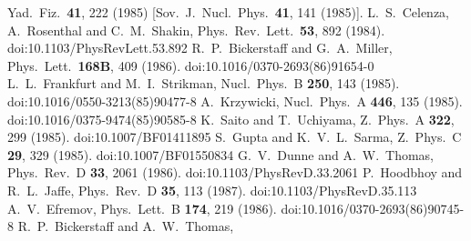 \documentclass{ws-ijmpe}
\begin{document}
\begin{thebibliography}{0}
  Yad.\ Fiz.\  {\bf 41}, 222 (1985)
  [Sov.\ J.\ Nucl.\ Phys.\  {\bf 41}, 141 (1985)].
%
  L.~S.~Celenza, A.~Rosenthal and C.~M.~Shakin,
  Phys.\ Rev.\ Lett.\  {\bf 53}, 892 (1984).
  doi:10.1103/PhysRevLett.53.892
%
  R.~P.~Bickerstaff and G.~A.~Miller,
  Phys.\ Lett.\  {\bf 168B}, 409 (1986).
  doi:10.1016/0370-2693(86)91654-0
%
  L.~L.~Frankfurt and M.~I.~Strikman,
  Nucl.\ Phys.\ B {\bf 250}, 143 (1985).
  doi:10.1016/0550-3213(85)90477-8
%
  A.~Krzywicki,
  Nucl.\ Phys.\ A {\bf 446}, 135 (1985).
  doi:10.1016/0375-9474(85)90585-8
%
  K.~Saito and T.~Uchiyama,
  Z.\ Phys.\ A {\bf 322}, 299 (1985).
  doi:10.1007/BF01411895
%
  S.~Gupta and K.~V.~L.~Sarma,
  Z.\ Phys.\ C {\bf 29}, 329 (1985).
  doi:10.1007/BF01550834
%
  G.~V.~Dunne and A.~W.~Thomas,
  Phys.\ Rev.\ D {\bf 33}, 2061 (1986).
  doi:10.1103/PhysRevD.33.2061
%
  P.~Hoodbhoy and R.~L.~Jaffe,
  Phys.\ Rev.\ D {\bf 35}, 113 (1987).
  doi:10.1103/PhysRevD.35.113
%
  A.~V.~Efremov,
  Phys.\ Lett.\ B {\bf 174}, 219 (1986).
  doi:10.1016/0370-2693(86)90745-8
%
  R.~P.~Bickerstaff and A.~W.~Thomas,

\end{thebibliography}
\end{document}
